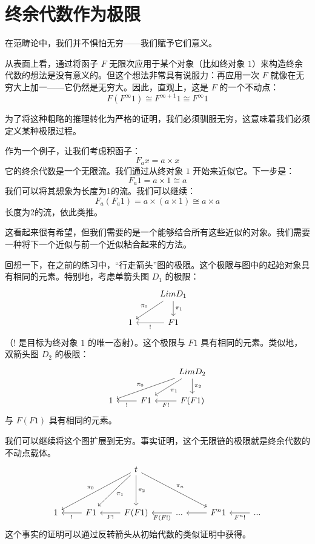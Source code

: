 \documentclass[DaoFP]{subfiles}
\begin{document}
\section{终余代数作为极限}

在范畴论中，我们并不惧怕无穷——我们赋予它们意义。

从表面上看，通过将函子 $F$ 无限次应用于某个对象（比如终对象 $1$）来构造终余代数的想法是没有意义的。但这个想法非常具有说服力：再应用一次 $F$ 就像在无穷大上加一——它仍然是无穷大。因此，直观上，这是 $F$ 的一个不动点：
\[ F (F^{\infty} 1) \cong F^{\infty + 1} 1 \cong F^{\infty} 1\]

为了将这种粗略的推理转化为严格的证明，我们必须驯服无穷，这意味着我们必须定义某种极限过程。

作为一个例子，让我们考虑积函子：
\[F_a x = a \times x \]
它的终余代数是一个无限流。我们通过从终对象 $1$ 开始来近似它。下一步是：
\[ F_a 1 = a \times 1 \cong a \]
我们可以将其想象为长度为1的流。我们可以继续：
\[ F_a (F_a 1) = a \times (a \times 1) \cong a \times a \]
长度为2的流，依此类推。

这看起来很有希望，但我们需要的是一个能够结合所有这些近似的对象。我们需要一种将下一个近似与前一个近似粘合起来的方法。

回想一下，在之前的练习中，“行走箭头”图的极限。这个极限与图中的起始对象具有相同的元素。特别地，考虑单箭头图 $D_1$ 的极限：
\[
 \begin{tikzcd}
 & Lim D_1
 \arrow[dl, "\pi_0"']
\arrow[d, "\pi_1"]
 \\
 1 
 & F1
 \arrow[l, "!"]
 \end{tikzcd}
\]
（$!$ 是目标为终对象 $1$ 的唯一态射）。这个极限与 $F 1$ 具有相同的元素。类似地，双箭头图 $D_2$ 的极限：
\[
 \begin{tikzcd}
 && Lim D_2
 \arrow[dll, "\pi_0"']
\arrow[dl, "\pi_1"]
\arrow[d, "\pi_2"]
 \\
 1 
 & F1
 \arrow[l, "!"]
  & F(F 1)
 \arrow[l, "F !"]
\end{tikzcd}
\]
与 $F(F 1)$ 具有相同的元素。

我们可以继续将这个图扩展到无穷。事实证明，这个无限链的极限就是终余代数的不动点载体。
\[
 \begin{tikzcd}
  && t
  \arrow[ddll, "\pi_0"']
  \arrow[ddl, "\pi_1"]
  \arrow[dd, "\pi_2"]
  \arrow[ddrr, "\pi_n"]
\\
\\
 1 
 & F 1
 \arrow[l, "!"]
 & F (F 1)
 \arrow[l, "F !"]
 & ...
 \arrow[l, "F(F !)"]
 & F^n 1
  \arrow[l]
 & ...
  \arrow[l, "F^n !"]
 \end{tikzcd}
\]
这个事实的证明可以通过反转箭头从初始代数的类似证明中获得。
\end{document}
